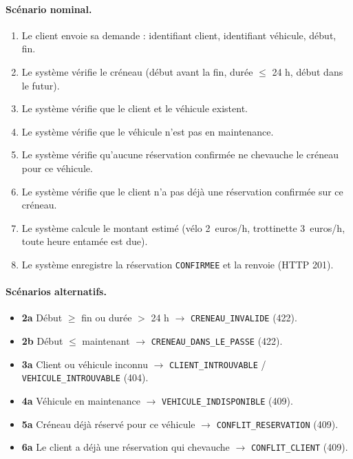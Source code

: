 \documentclass[11pt,a4paper]{article}
\begin{document}
\paragraph{Scénario nominal.}
\begin{enumerate}
  \item Le client envoie sa demande : identifiant client, identifiant véhicule, début, fin.
  \item Le système vérifie le créneau (début avant la fin, durée $\le$ 24 h, début dans le futur).
  \item Le système vérifie que le client et le véhicule existent.
  \item Le système vérifie que le véhicule n'est pas en maintenance.
  \item Le système vérifie qu'aucune réservation confirmée ne chevauche le créneau pour ce véhicule.
  \item Le système vérifie que le client n'a pas déjà une réservation confirmée sur ce créneau.
  \item Le système calcule le montant estimé (vélo 2~euros/h, trottinette 3~euros/h, toute heure entamée est due).
  \item Le système enregistre la réservation \texttt{CONFIRMEE} et la renvoie (HTTP 201).
\end{enumerate}

\paragraph{Scénarios alternatifs.}
\begin{itemize}
  \item \textbf{2a} Début $\ge$ fin ou durée $>$ 24 h $\rightarrow$ \texttt{CRENEAU\_INVALIDE} (422).
  \item \textbf{2b} Début $\le$ maintenant $\rightarrow$ \texttt{CRENEAU\_DANS\_LE\_PASSE} (422).
  \item \textbf{3a} Client ou véhicule inconnu $\rightarrow$ \texttt{CLIENT\_INTROUVABLE} / \texttt{VEHICULE\_INTROUVABLE} (404).
  \item \textbf{4a} Véhicule en maintenance $\rightarrow$ \texttt{VEHICULE\_INDISPONIBLE} (409).
  \item \textbf{5a} Créneau déjà réservé pour ce véhicule $\rightarrow$ \texttt{CONFLIT\_RESERVATION} (409).
  \item \textbf{6a} Le client a déjà une réservation qui chevauche $\rightarrow$ \texttt{CONFLIT\_CLIENT} (409).
\end{itemize}
\end{document}
